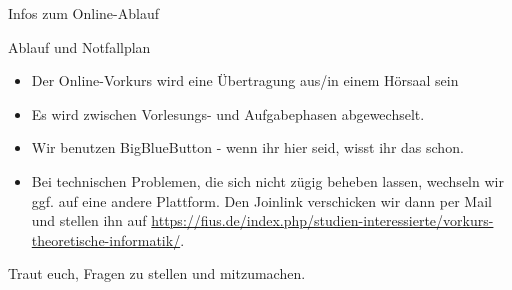 
\begin{frame}[fragile]{Infos zum Online-Ablauf}
	\begin{alertblock}{Ablauf und Notfallplan}
		\begin{itemize}
            \item Der Online-Vorkurs wird eine Übertragung aus/in einem Hörsaal sein
			\item Es wird zwischen Vorlesungs- und Aufgabephasen abgewechselt.
			\item Wir benutzen BigBlueButton - wenn ihr hier seid, wisst ihr das schon. 
            \item Bei technischen Problemen, die sich nicht zügig beheben lassen, wechseln wir ggf. auf eine andere Plattform. Den Joinlink verschicken wir dann per Mail und stellen ihn auf \url{https://fius.de/index.php/studien-interessierte/vorkurs-theoretische-informatik/}.
		\end{itemize}
		\alert{Traut euch, Fragen zu stellen und mitzumachen.}
	\end{alertblock}
\end{frame}
